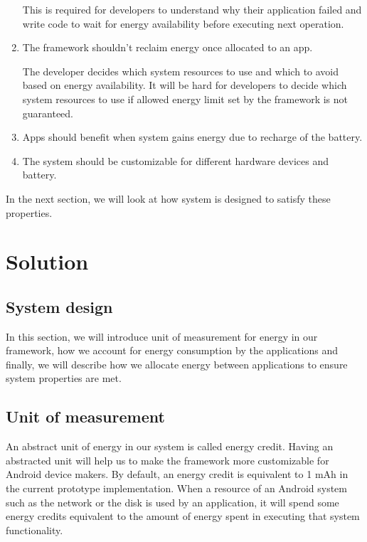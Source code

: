 \begin{enumerate}
This is required for developers to understand why their application failed and write code to wait for energy availability before executing next operation.

\item The framework shouldn't reclaim energy once allocated to an app.  

The developer decides which system resources to use and which to avoid based on energy availability.  It will be hard for developers to decide which system resources to use if allowed energy limit set by the framework is not guaranteed.

\item Apps should benefit when system gains energy due to recharge of the battery.
\item The system should be customizable for different hardware devices and battery.

\end{enumerate}


In the next section, we will look at how system is designed to satisfy these properties.


\section{Solution}



\subsection{System design}


In this section, we will introduce unit of measurement for energy in our framework, how we account for energy consumption by the applications and finally, we will describe how we allocate energy between applications to ensure system properties are met.

\subsection{Unit of measurement}

An abstract unit of energy in our system is called energy credit. Having an abstracted unit will help us to make the framework more customizable for Android device makers. By default, an energy credit is equivalent to 1 mAh in the current prototype implementation. When a resource of an Android system such as the network or the disk is used by an application, it will spend some energy credits equivalent to the amount of energy spent in executing that system functionality.

